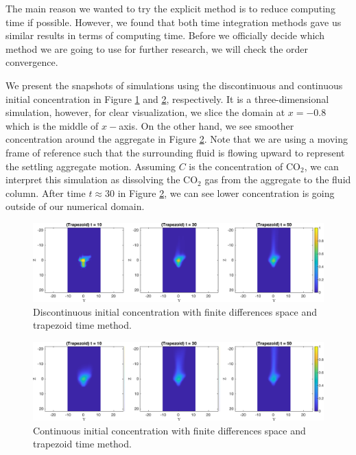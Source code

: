 The main reason we wanted to try the explicit method is to reduce computing time if possible. However, we found that both time integration methods gave us similar results in terms of computing time. Before we officially decide which method we are going to use for further research, we will check the order convergence.
\par
We present the snapshots of simulations using the discontinuous and continuous initial concentration in Figure \ref{fig_ic4_trap_snap} and \ref{fig_icG_trap_snap}, respectively. It is a three-dimensional simulation, however, for clear visualization, we slice the domain at $x= -0.8$ which is the middle of $x-$axis.
On the other hand, we see smoother concentration around the aggregate in Figure \ref{fig_icG_trap_snap}. Note that we are using a moving frame of reference such that the surrounding fluid is flowing upward to represent the settling aggregate motion. Assuming $C$ is the concentration of CO$_2$, we can interpret this simulation as dissolving the CO$_2$ gas from the aggregate to the fluid column. 
After time $t \approx 30$ in Figure \ref{fig_icG_trap_snap}, we can see lower concentration is going outside of our numerical domain.  
 \begin{figure}[h]
 \begin{center}
	\includegraphics[scale=0.7]{./figures/fig_ic4_Trap_snap135}
 \end{center}
 \caption{Discontinuous initial concentration with finite differences space and trapezoid time method.}
 \label{fig_ic4_trap_snap}
 \end{figure}
 \begin{figure}[h]
 \begin{center}
	\includegraphics[scale=0.7]{./figures/fig_icG_Trap_snap135}
 \end{center}
 \caption{Continuous initial concentration with finite differences space and trapezoid time method.}
 \label{fig_icG_trap_snap}
 \end{figure}
